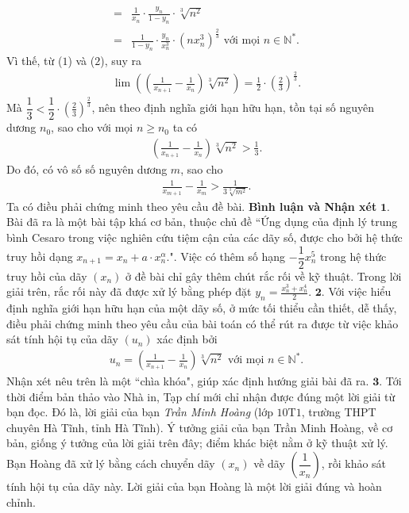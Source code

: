\begin{multicols}{2}
\begin{align*}
		= &\frac{1}{{{x_n}}} \cdot \frac{{{y_n}}}{{1 - {y_n}}} \cdot \sqrt[3]{{{n^2}}} \\
		= &\frac{1}{{1 - {y_n}}} \cdot \frac{{{y_n}}}{{x_n^3}} \cdot {\left( {nx_n^3} \right)^{\frac{2}{3}}} \text{ với mọi } n\in \mathbb{N^*}.
	\end{align*}  
	Vì thế, từ ($1$) và ($2$), suy ra
	\begin{align*}
		\lim \left( {\left( {\frac{1}{{{x_{n + 1}}}} - \frac{1}{{{x_n}}}} \right)\sqrt[3]{{{n^2}}}} \right) = \frac{1}{2} \cdot {\left( {\frac{2}{3}} \right)^{\frac{2}{3}}}.
	\end{align*}
	Mà  $\dfrac{1}{3} < \dfrac{1}{2} \cdot {\left( {\frac{2}{3}} \right)^{\frac{2}{3}}}$, nên theo định nghĩa giới hạn hữu hạn, tồn tại số nguyên dương  $n_0$, sao cho với mọi $n \ge n_0$  ta có
	\begin{align*}
		\left( {\frac{1}{{{x_{n + 1}}}} - \frac{1}{{{x_n}}}} \right)\sqrt[3]{{{n^2}}} > \frac{1}{3}.
	\end{align*}
	Do đó, có vô số số nguyên dương $m$, sao cho
	\begin{align*}
		\frac{1}{{{x_{m + 1}}}} - \frac{1}{{{x_m}}} > \frac{1}{{3\sqrt[3]{{{m^2}}}}}.
	\end{align*}
	Ta có điều phải chứng minh theo yêu cầu đề bài.
	\vskip 0.05cm
	\textbf{\color{thachthuctoanhoc}Bình luận và Nhận xét}
	\vskip 0.05cm
	$\pmb{1.}$ Bài đã ra là một bài tập khá cơ bản, thuộc chủ đề ``Ứng dụng của định lý trung bình Cesaro trong việc nghiên cứu tiệm cận của các dãy số, được cho bởi hệ thức truy hồi dạng ${x_{n + 1}} = {x_n} + a \cdot x_n^\alpha .$". Việc có thêm số hạng $-\dfrac{1}{2}x_n^5$ trong hệ thức truy hồi của dãy $(x_n)$  ở đề bài chỉ gây thêm chút rắc rối về kỹ thuật. Trong lời giải trên, rắc rối này đã được xử lý bằng phép đặt  ${y_n} = \frac{{x_n^3 + x_n^4}}{2}$.
	\vskip 0.05cm
	$\pmb{2.}$ Với việc hiểu định nghĩa giới hạn hữu hạn của một dãy số, ở mức tối thiểu cần thiết, dễ thấy, điều phải chứng minh theo yêu cầu của bài toán có thể rút ra được từ việc khảo sát tính hội tụ của dãy $(u_n)$  xác định bởi
	\begin{align*}
		{u_n} = \left( {\frac{1}{{{x_{n + 1}}}} - \frac{1}{{{x_n}}}} \right)\sqrt[3]{{{n^2}}} \text{ với mọi } n \in \mathbb{N^*}.
	\end{align*}
	Nhận xét nêu trên là một ``chìa khóa", giúp xác định hướng giải bài đã ra.
	\vskip 0.05cm
	$\pmb{3.}$ Tới thời điểm bản thảo vào Nhà in, Tạp chí mới chỉ nhận được đúng một lời giải từ bạn đọc. Đó là, lời giải của bạn \textit{Trần Minh Hoàng} (lớp $10$T$1$, trường THPT chuyên Hà Tĩnh, tỉnh Hà Tĩnh). Ý tưởng giải của bạn Trần Minh Hoàng, về cơ bản, giống ý tưởng của lời giải trên đây; điểm khác biệt nằm ở kỹ thuật xử lý. Bạn Hoàng đã xử lý bằng cách chuyển dãy $(x_n)$  về dãy  $\left(\dfrac{1}{x_n}\right)$, rồi khảo sát tính hội tụ của dãy này. Lời giải của bạn Hoàng là một lời giải đúng và hoàn chỉnh.

\end{multicols}

